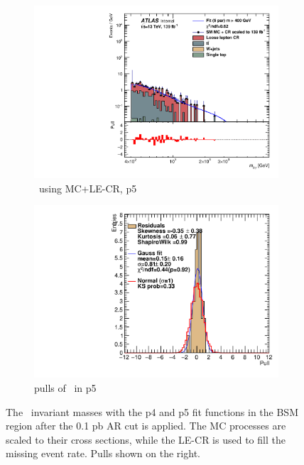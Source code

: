 \begin{figure}[ht]
\begin{subfigure}[h]{0.38\linewidth}
    \includegraphics[scale=0.3]{figs/ch6/fit/variable_nosmooth/p5/01PB/output_SMMCplusCR_Mbg_p5.pdf}%
     \caption{\mjph \ using MC+LE-CR, p5}
     \end{subfigure}
     \hfill
    \begin{subfigure}[h]{0.4\linewidth}
    \includegraphics[scale=0.32]{figs/ch6/fit/variable_nosmooth/p5/01PB/pull_SMMCplusCR_Mbg_p5.pdf}%
    \caption{pulls of \mbph \ in p5}
    \end{subfigure}
    \caption{The \mbph \ invariant masses with the p4 and p5 fit functions in the BSM region after the 0.1 pb AR cut is applied. The MC processes are scaled to their cross sections, while the LE-CR is used to fill the missing event rate. Pulls shown on the right.}
\label{fig:mbg-fit-pulls-01pb}
\end{figure}

